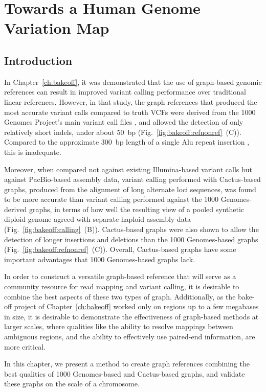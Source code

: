 \chapter{Towards a Human Genome Variation Map}
\label{ch:hgvm}

\section{Introduction}

In Chapter~\ref{ch:bakeoff}, it was demonstrated that the use of graph-based genomic references can result in improved variant calling performance over traditional linear references. However, in that study, the graph references that produced the most accurate variant calls compared to truth VCFs were derived from the 1000 Genomes Project's main variant call files \cite{10002015global}, and allowed the detection of only relatively short indels, under about 50~bp (Fig.~\ref{fig:bakeoff:refnonref}~(C)). Compared to the approximate 300~bp length of a single Alu repeat insertion \cite{weiner1980abundant}, this is inadequate.

Moreover, when compared not against existing Illumina-based variant calls but against PacBio-based assembly data, variant calling performed with Cactus-based graphs, produced from the alignment of long alternate loci sequences, was found to be more accurate than variant calling performed against the 1000 Genomes-derived graphs, in terms of how well the resulting view of a pooled synthetic diploid genome agreed with separate haploid assembly data (Fig.~\ref{fig:bakeoff:calling}~(B)). Cactus-based graphs were also shown to allow the detection of longer insertions and deletions than the 1000 Genomes-based graphs (Fig.~\ref{fig:bakeoff:refnonref}~(C)). Overall, Cactus-based graphs have some important advantages that 1000 Genomes-based graphs lack.

In order to construct a versatile graph-based reference that will serve as a community resource for read mapping and variant calling, it is desirable to combine the best aspects of these two types of graph. Additionally, as the bake-off project of Chapter~\ref{ch:bakeoff} worked only on regions up to a few megabases in size, it is desirable to demonstrate the effectiveness of graph-based methods at larger scales, where qualities like the ability to resolve mappings between ambiguous regions, and the ability to effectively use paired-end information, are more critical.

In this chapter, we present a method to create graph references combining the best qualities of 1000 Genomes-based and Cactus-based graphs, and validate these graphs on the scale of a chromosome.

